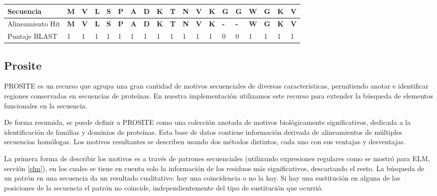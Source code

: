 \noindent
\begin{tabular}{lllllllllllllllllll} 
\hline
Secuencia 		& \textbf{M} & \textbf{V} & \textbf{L} & \textbf{S} & \textbf{P} & \textbf{A} & \textbf{D} & \textbf{K} & \textbf{T} & \textbf{N} & \textbf{V} & \textbf{K} & \textbf{G} & \textbf{G} & \textbf{W} & \textbf{G} & \textbf{K} & \textbf{V}\\ \hline
Alineamiento Hit	& \textbf{M} & \textbf{V} & \textbf{L} & \textbf{S} & \textbf{P} & \textbf{A} & \textbf{D} & \textbf{K} & \textbf{T} & \textbf{N} & \textbf{V} & \textbf{K} & \textbf{-} & \textbf{-} & \textbf{W} & \textbf{G} & \textbf{K} & \textbf{V}\\ \hline
Puntaje BLAST 		& 1 & 1 & 1 & 1 & 1 & 1 & 1 & 1 & 1 & 1 & 1 & 1 & 0 & 0 & 1 & 1 & 1 & 1 \\ \hline
\end{tabular}














\subsection{Prosite}\label{prosite}

PROSITE \cite{sigrist2002prosite,prositeWeb} es un recurso que agrupa una gran cantidad de motivos secuenciales de diversas características,
permitiendo anotar e identificar regiones conservadas en secuencias de proteínas.
En nuestra implementación utilizamos este recurso para extender la búsqueda de elementos funcionales en la secuencia.  

De forma resumida, se puede definir a PROSITE como una colección anotada de motivos biológicamente significativos, dedicada a la identificación de familias y dominios de proteínas.
Esta base de datos contiene información derivada de alineamientos de múltiples secuencias homólogas. 
Los motivos resultantes se describen usando dos métodos distintos, cada uno con sus ventajas y desventajas.

La primera forma de describir los motivos es a través de patrones secuenciales (utilizando expresiones regulares como se mostró para ELM, sección \ref{elm}),
en los cuales se tiene en cuenta solo la información de los residuos más significativos, descartando el resto. 
La búsqueda de un patrón en una secuencia da un resultado cualitativo: hay una coincidencia o no la hay. 
Si hay una sustitución en alguna de las posiciones de la secuencia el patrón no coincide, independientemente del tipo de sustitución que ocurrió.

